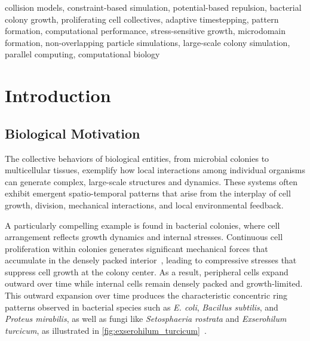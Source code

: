 \documentclass[conference]{IEEEtran}
\begin{document}
\begin{IEEEkeywords}
    collision models, constraint-based simulation, potential-based repulsion, bacterial colony growth, proliferating cell collectives, adaptive timestepping, pattern formation, computational performance, stress-sensitive growth, microdomain formation, non-overlapping particle simulations, large-scale colony simulation, parallel computing, computational biology
\end{IEEEkeywords}

\section{Introduction}
\subsection{Biological Motivation}

The collective behaviors of biological entities, from microbial colonies to multicellular tissues, exemplify how local interactions among individual organisms can generate complex, large-scale structures and dynamics. These systems often exhibit emergent spatio-temporal patterns that arise from the interplay of cell growth, division, mechanical interactions, and local environmental feedback.

A particularly compelling example is found in bacterial colonies, where cell arrangement reflects growth dynamics and internal stresses. Continuous cell proliferation within colonies generates significant mechanical forces that accumulate in the densely packed interior~\cite{Wittmann2023}, leading to compressive stresses that suppress cell growth at the colony center. As a result, peripheral cells expand outward over time while internal cells remain densely packed and growth-limited. This outward expansion over time produces the characteristic concentric ring patterns observed in bacterial species such as \textit{E. coli}, \textit{Bacillus subtilis}, and \textit{Proteus mirabilis}, as well as fungi like \textit{Setosphaeria rostrata} and \textit{Exserohilum turcicum}, as illustrated in \autoref{fig:exserohilum_turcicum}~\cite{YAMAZAKI2005136}.
\end{document}
